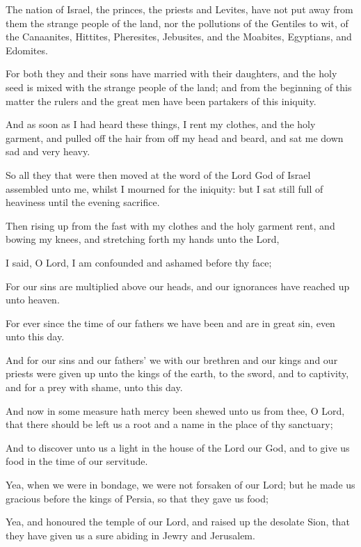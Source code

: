 {\par }{\PP {}The nation of Israel, the princes, the priests and Levites, have not put away from them the strange people of the land, nor the pollutions of the Gentiles to wit, of the Canaanites, Hittites, Pheresites, Jebusites, and the Moabites, Egyptians, and Edomites.
\par }{\PP {}For both they and their sons have married with their daughters, and the holy seed is mixed with the strange people of the land; and from the beginning of this matter the rulers and the great men have been partakers of this iniquity.
\par }{\PP {}And as soon as I had heard these things, I rent my clothes, and the holy garment, and pulled off the hair from off my head and beard, and sat me down sad and very heavy.
\par }{\PP {}So all they that were then moved at the word of the Lord God of Israel assembled unto me, whilst I mourned for the iniquity: but I sat still full of heaviness until the evening sacrifice.
\par }{\PP {}Then rising up from the fast with my clothes and the holy garment rent, and bowing my knees, and stretching forth my hands unto the Lord,
\par }{\PP {}I said, O Lord, I am confounded and ashamed before thy face;
\par }{\PP {}For our sins are multiplied above our heads, and our ignorances have reached up unto heaven.
\par }{\PP {}For ever since the time of our fathers we have been and are in great sin, even unto this day.
\par }{\PP {}And for our sins and our fathers’ we with our brethren and our kings and our priests were given up unto the kings of the earth, to the sword, and to captivity, and for a prey with shame, unto this day.
\par }{\PP {}And now in some measure hath mercy been shewed unto us from thee, O Lord, that there should be left us a root and a name in the place of thy sanctuary;
\par }{\PP {}And to discover unto us a light in the house of the Lord our God, and to give us food in the time of our servitude.
\par }{\PP {}Yea, when we were in bondage, we were not forsaken of our Lord; but he made us gracious before the kings of Persia, so that they gave us food;
\par }{\PP {}Yea, and honoured the temple of our Lord, and raised up the desolate Sion, that they have given us a sure abiding in Jewry and Jerusalem.
}
